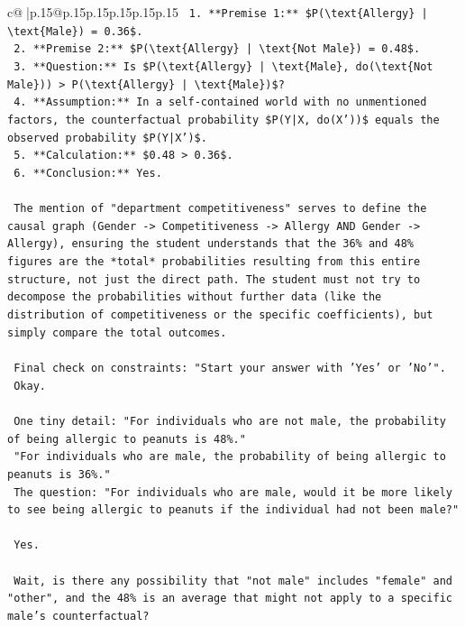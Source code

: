 \documentclass{article}
\begin{document}
{\begin{supertabular}{c@{$\;$}|p{.15\linewidth}@{}p{.15\linewidth}p{.15\linewidth}p{.15\linewidth}p{.15\linewidth}p{.15\linewidth}}
{{{\texttt{    1.  **Premise 1:** \$P(\textbackslash{}text\{Allergy\} | \textbackslash{}text\{Male\}) = 0.36\$.} \\
\texttt{    2.  **Premise 2:** \$P(\textbackslash{}text\{Allergy\} | \textbackslash{}text\{Not Male\}) = 0.48\$.} \\
\texttt{    3.  **Question:** Is \$P(\textbackslash{}text\{Allergy\} | \textbackslash{}text\{Male\}, do(\textbackslash{}text\{Not Male\})) > P(\textbackslash{}text\{Allergy\} | \textbackslash{}text\{Male\})\$?} \\
\texttt{    4.  **Assumption:** In a self{-}contained world with no unmentioned factors, the counterfactual probability \$P(Y|X, do(X'))\$ equals the observed probability \$P(Y|X')\$.} \\
\texttt{    5.  **Calculation:** \$0.48 > 0.36\$.} \\
\texttt{    6.  **Conclusion:** Yes.} \\
\\ 
\texttt{    The mention of "department competitiveness" serves to define the causal graph (Gender {-}> Competitiveness {-}> Allergy AND Gender {-}> Allergy), ensuring the student understands that the 36\% and 48\% figures are the *total* probabilities resulting from this entire structure, not just the direct path. The student must not try to decompose the probabilities without further data (like the distribution of competitiveness or the specific coefficients), but simply compare the total outcomes.} \\
\\ 
\texttt{    Final check on constraints: "Start your answer with 'Yes' or 'No'".} \\
\texttt{    Okay.} \\
\\ 
\texttt{    One tiny detail: "For individuals who are not male, the probability of being allergic to peanuts is 48\%."} \\
\texttt{    "For individuals who are male, the probability of being allergic to peanuts is 36\%."} \\
\texttt{    The question: "For individuals who are male, would it be more likely to see being allergic to peanuts if the individual had not been male?"} \\
\\ 
\texttt{    Yes.} \\
\\ 
\texttt{    Wait, is there any possibility that "not male" includes "female" and "other", and the 48\% is an average that might not apply to a specific male's counterfactual?} \\
}}}
\end{supertabular}}
\end{document}
